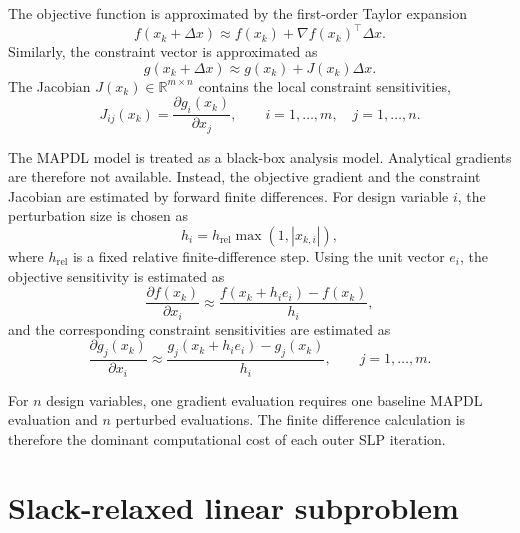 The objective function is approximated by the first-order Taylor
expansion
\begin{equation}
\label{eq:appA_lin_f}
    f(x_k + \Delta x)
    \approx
    f(x_k) + \nabla f(x_k)^{\!\top}\Delta x .
\end{equation}
Similarly, the constraint vector is approximated as
\begin{equation}
\label{eq:appA_lin_g}
    g(x_k + \Delta x)
    \approx
    g(x_k) + J(x_k)\Delta x .
\end{equation}
The Jacobian $J(x_k) \in \mathbb{R}^{m \times n}$ contains the local
constraint sensitivities,
\begin{equation}
\label{eq:appA_jacobian}
    J_{ij}(x_k)
    =
    \frac{\partial g_i(x_k)}{\partial x_j},
    \qquad
    i = 1,\dots,m,\quad j = 1,\dots,n .
\end{equation}

The MAPDL model is treated as a black-box analysis model. Analytical
gradients are therefore not available. Instead, the objective
gradient and the constraint Jacobian are estimated by forward finite
differences. For design variable $i$, the perturbation size is chosen
as
\begin{equation}
\label{eq:appA_fd_step}
    h_i =
    h_{\mathrm{rel}}
    \max\left(1, |x_{k,i}|\right),
\end{equation}
where $h_{\mathrm{rel}}$ is a fixed relative finite-difference step.
Using the unit vector $e_i$, the objective sensitivity is estimated
as
\begin{equation}
\label{eq:appA_fd_f}
    \frac{\partial f(x_k)}{\partial x_i}
    \approx
    \frac{
        f(x_k + h_i e_i) - f(x_k)
    }{h_i},
\end{equation}
and the corresponding constraint sensitivities are estimated as
\begin{equation}
\label{eq:appA_fd_g}
    \frac{\partial g_j(x_k)}{\partial x_i}
    \approx
    \frac{
        g_j(x_k + h_i e_i) - g_j(x_k)
    }{h_i},
    \qquad j = 1,\dots,m .
\end{equation}

For $n$ design variables, one gradient evaluation requires one
baseline MAPDL evaluation and $n$ perturbed evaluations. The finite
difference calculation is therefore the dominant computational cost
of each outer SLP iteration.

\section{Slack-relaxed linear subproblem}
\label{sec:slpA:lp}

